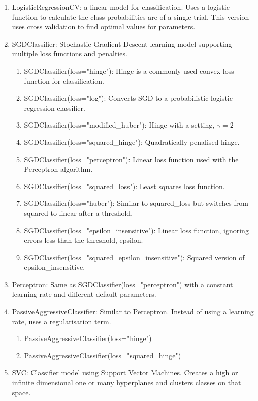 \documentclass[twoside,11pt]{article}
\begin{document}
\begin{enumerate}
\scriptsize

\item LogisticRegressionCV: a linear model for classification. Uses a logistic function to calculate the class probabilities are of a single trial. This version uses cross validation to find optimal values for parameters.
\item SGDClassifier: Stochastic Gradient Descent learning model supporting multiple loss functions and penalties. 
\begin{enumerate}
\item SGDClassifier(loss="hinge"): Hinge is a commonly used convex loss function for classification.
\item SGDClassifier(loss="log"): Converts SGD to a probabilistic logistic regression classifier.
\item SGDClassifier(loss="modified\_huber"): Hinge with a setting, $\gamma=2$
\item SGDClassifier(loss="squared\_hinge"): Quadratically penalised hinge.
\item SGDClassifier(loss="perceptron"): Linear loss function used with the Perceptron algorithm.
\item SGDClassifier(loss="squared\_loss"): Least squares loss function.
\item SGDClassifier(loss="huber"): Similar to squared\_loss but switches from squared to linear after a threshold.
\item SGDClassifier(loss="epsilon\_insensitive"): Linear loss function, ignoring errors less than the threshold, epsilon.
\item SGDClassifier(loss="squared\_epsilon\_insensitive"): Squared version of epsilon\_insensitive.
\end{enumerate}
\item Perceptron: Same as SGDClassifier(loss="perceptron") with a constant learning rate and different default parameters.
\item PassiveAggressiveClassifier: Similar to Perceptron. Instead of using a learning rate, uses a regularisation term.
\begin{enumerate}
\item PassiveAggressiveClassifier(loss="hinge")
\item PassiveAggressiveClassifier(loss="squared\_hinge")
\end{enumerate}
\item SVC: Classifier model using Support Vector Machines. Creates a high or infinite dimensional one or many hyperplanes and clusters classes on that space.

\end{enumerate}
\end{document}
